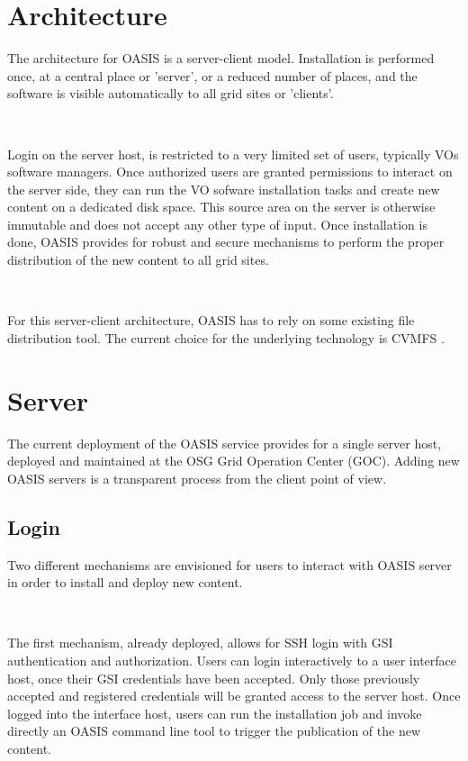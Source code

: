 \documentclass[a4paper]{jpconf}
\begin{document}
\section{Architecture}

The architecture for OASIS is a server-client model. 
Installation is performed once, at a central place or 'server', 
or a reduced number of places,
and the software is visible automatically to all grid sites or 'clients'.  

~

Login on the server host, 
is restricted to a very limited set of users,
typically VOs software managers. 
Once authorized users are granted permissions to interact on the server side, 
they can run the VO sofware installation tasks and create new content on a dedicated disk space.
This  source area on the server is otherwise immutable and 
does not accept any other type of input.
Once installation is done, OASIS provides for robust and secure mechanisms 
to perform the proper distribution of the new content to all grid sites. 

~

For this server-client architecture, OASIS has to rely on some existing file distribution tool.
The current choice for the underlying technology is CVMFS \cite{cvmfs}.


\section{Server}

The current deployment of the OASIS service provides for a single server host,
deployed and maintained at the OSG Grid Operation Center (GOC).
Adding new OASIS servers is a transparent process from the client point of view.


\subsection{Login}

Two different mechanisms are envisioned for users 
to interact with OASIS server in order to install and deploy new content.

~

The first mechanism, already deployed, allows for SSH \cite{ssh} login with GSI
\cite{gsi} authentication and authorization.
Users can login interactively to a user interface host,
once their GSI credentials have been accepted.
Only those previously accepted and registered credentials will be granted access to the server host.
Once logged into the interface host, users can run the installation job
and invoke directly an OASIS command line tool to trigger the publication of the new content.
\end{document}
